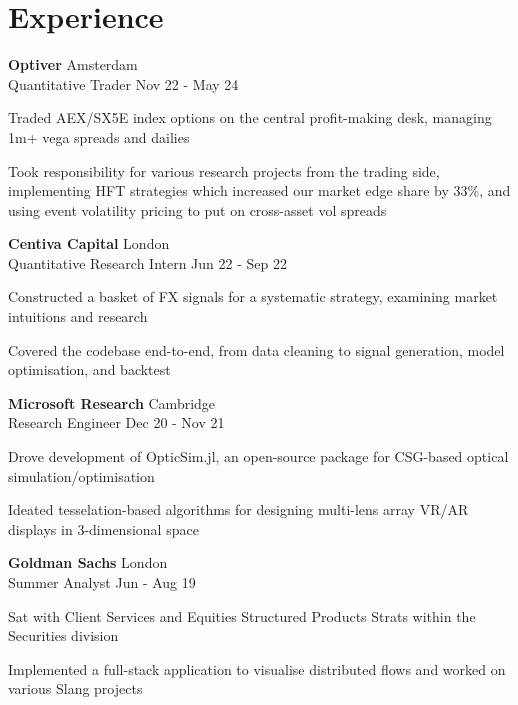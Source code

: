 \documentclass[letterpaper, 10pt]{article}
\begin{document}
\section*{Experience}
\textbf{Optiver} \hfill Amsterdam\\
Quantitative Trader \hfill Nov 22 - May 24
\begin{compact}
	\item Traded AEX/SX5E index options on the central profit-making desk, managing 1m+ vega spreads and dailies
	\item Took responsibility for various research projects from the trading side, implementing HFT strategies which increased our market edge share by 33\%, and using event volatility pricing to put on cross-asset vol spreads
\end{compact}
\vspace{.5\baselineskip}
\textbf{Centiva Capital} \hfill London\\
Quantitative Research Intern \hfill Jun 22 - Sep 22
\begin{compact}
	\item Constructed a basket of FX signals for a systematic strategy, examining market intuitions and research
	\item Covered the codebase end-to-end, from data cleaning to signal generation, model optimisation, and backtest
\end{compact}
\vspace{.5\baselineskip}
\textbf{Microsoft Research} \hfill Cambridge\\
Research Engineer \hfill Dec 20 - Nov 21
\begin{compact}
	\item Drove development of OpticSim.jl, an open-source package for CSG-based optical simulation/optimisation
	\item Ideated tesselation-based algorithms for designing multi-lens array VR/AR displays in 3-dimensional space
\end{compact}
\vspace{.5\baselineskip}
\textbf{Goldman Sachs} \hfill London\\
Summer Analyst \hfill Jun - Aug 19
\begin{compact}
	\item Sat with Client Services and Equities Structured Products Strats within the Securities division
	\item Implemented a full-stack application to visualise distributed flows and worked on various Slang projects
\end{compact}
\end{document}
